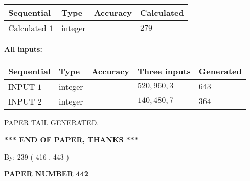 \documentclass{ctexart}
\begin{document}
   
   
   
\noindent{}
   
   
  
  
\noindent\begin{tabular}{|l|l|l|l|}
\hline
 Sequential & Type & Accuracy & Calculated \\ 
\hline
 
 
  Calculated $  1 $ & integer &  & 
  $ 279 $ 
 \\  \hline  
 \end{tabular}
   
   
   
   
\noindent\vspace{0.1in}\hspace{-0.08in} {\textbf{\Large{All inputs: }}}
   
   
  
  
\noindent\begin{tabular}{|l|l|l|l|l|}
\hline
 Sequential & Type & Accuracy & Three inputs & Generated \\ 
\hline
 
 
  INPUT $  1 $ & integer &  & $
 520
 , 
 960
 , 
 3
 $ & $ 643 $ 
 \\  \hline  
 
 
  INPUT $  2 $ & integer &  & $
 140
 , 
 480
 , 
 7
 $ & $ 364 $ 
 \\  \hline  
 \end{tabular}
   
   
   
   
   
   
 \vspace{0.2in}
 
   
   
\vspace{2.0in} PAPER TAIL GENERATED.
   
   
   
   
\vspace{1.0in} 
{\textbf{\large{ *** END OF PAPER, THANKS *** }}} 
   
   
\hspace{1.0in} By: 
 239 ( 416 ,  443 )
   
   
   
   
\newpage 
\setcounter{page}{ 
   442001 } 
   
   
   
   
 {\textbf{ \Large{ PAPER NUMBER  442  }}}
   
\end{document}
